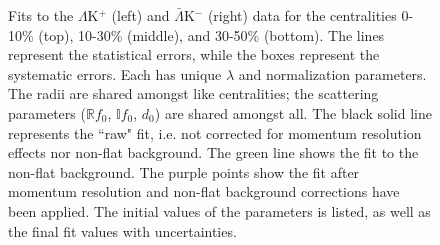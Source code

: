 \documentclass[../AnalysisNoteJBuxton.tex]{subfiles}
\renewcommand{\ResNum}{_NoRes}
\renewcommand{\SaveNameModLamKch}{\MomRes\NonFlatBgd\ResNum\ParamFixAndShareLamKch}
\begin{document}
\begin{landscape}
\begin{figure}[h]
  \centering
  \caption[$\Lambda$K$^{+}$($\bar{\Lambda}$K$^{-}$) Fits, with NO residual correlations included, with No Residuals]{Fits to the $\Lambda$K$^{+}$ (left) and $\bar{\Lambda}$K$^{-}$ (right) data for the centralities 0-10\% (top), 10-30\% (middle), and 30-50\% (bottom).
The lines represent the statistical errors, while the boxes represent the systematic errors.  
Each has unique $\lambda$ and normalization parameters.
The radii are shared amongst like centralities; the scattering parameters ($\mathbb{R}f_{0}$, $\mathbb{I}f_{0}$, $d_{0}$) are shared amongst all.
The black solid line represents the ``raw" fit, i.e. not corrected for momentum resolution effects nor non-flat background.  
The green line shows the fit to the non-flat background.
The purple points show the fit after momentum resolution and non-flat background corrections have been applied.
The initial values of the parameters is listed, as well as the final fit values with uncertainties.}
  \label{fig:LamKchPwConjFits_NoRes}
\end{figure}


\end{landscape}
\end{document}
